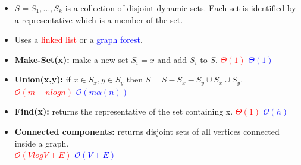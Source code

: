 \documentclass[a4paper,landscape]{article}
\newcommand{\timecomplexity}[1]{\textcolor{red}{#1}}
\newcommand{\bigo}{\mathcal{O}}
\begin{document}
\begin{multicols}{7}
\tcolorbox[mybox={Disjoint sets}]
\begin{itemize}[noitemsep,itemsep=0pt]
    \item \(S = {S_1, ..., S_k}\) is a collection of disjoint dynamic sets. Each set is identified by a representative which is a member of the set.
    \item Uses a \timecomplexity{linked list} or a \textcolor{blue}{graph forest}.
    \item \textbf{Make-Set(x):} make a new set \(S_i = {x}\) and add $S_i$ to $S$. \timecomplexity{\(\Theta(1)\)} \textcolor{blue}{\(\Theta(1)\)}
    \item \textbf{Union(x,y):} if \(x \in S_x, y \in S_y\) then \(S = S - S_x - S_y \cup {S_x \cup S_y}\). \timecomplexity{\(\bigo(m+nlogn)\)} \textcolor{blue}{\(\bigo(m \alpha(n))\)}
    \item \textbf{Find(x):} returns the representative of the set containing x. \timecomplexity{\(\Theta(1)\)} \textcolor{blue}{\(\bigo(h)\)}
    \item \textbf{Connected components:} returns disjoint sets of all vertices connected inside a graph. \\ \timecomplexity{\(\bigo(VlogV + E)\)} \textcolor{blue}{\(\bigo(V+E)\)}
\end{itemize}
\endtcolorbox


\end{multicols}
\end{document}

